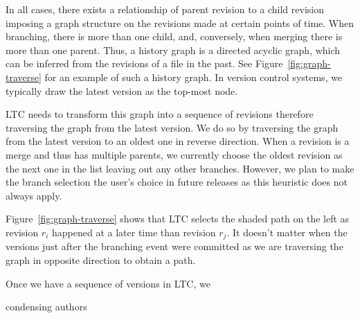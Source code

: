 In all cases, there exists a relationship of parent revision to a child revision imposing a graph structure on the revisions made at certain points of time.  When branching, there is more than one child, and, conversely, when merging there is more than one parent.  Thus, a history graph is a directed acyclic graph, which can be inferred from the revisions of a file in the past.  See Figure~\ref{fig:graph-traverse} for an example of such a history graph.  In version control systems, we typically draw the latest version as the top-most node.

LTC needs to transform this graph into a sequence of revisions therefore traversing the graph from the latest version.  We do so by traversing the graph from the latest version to an oldest one in reverse direction.  When a revision is a merge and thus has multiple parents, we currently choose the oldest revision as the next one in the list leaving out any other branches.  However, we plan to make the branch selection the user's choice in future releases as this heuristic does not always apply.

Figure~\ref{fig:graph-traverse} shows that LTC selects the shaded path on the left as revision $r_{i}$ happened at a later time than revision $r_{j}$.  It doesn't matter when the versions just after the branching event were committed as we are traversing the graph in opposite direction to obtain a path.

Once we have a sequence of versions in LTC, we 

condensing authors

